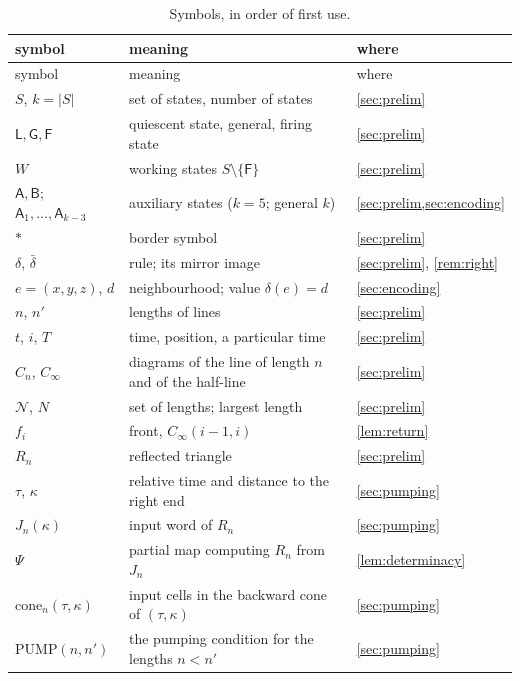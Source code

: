 {\small
\begin{longtable}{@{}p{}>{\raggedright\arraybackslash}p{}>{\raggedright\arraybackslash}p{}@{}}
\caption{Symbols, in order of first use.}\label{tab:symbols}\\
\toprule
symbol & meaning & where\\
\midrule
\endfirsthead
\toprule
symbol & meaning & where\\
\midrule
\endhead
\bottomrule
\endfoot
$S$, $k=|S|$ & set of states, number of states & \cref{sec:prelim}\\
$\mathsf L,\mathsf G,\mathsf F$ & quiescent state, general, firing state & \cref{sec:prelim}\\
$W$ & working states $S\setminus\{\mathsf F\}$ & \cref{sec:prelim}\\
$\mathsf A,\mathsf B$; $\mathsf A_1,\dots,\mathsf A_{k-3}$ & auxiliary states ($k=5$; general $k$) & \cref{sec:prelim,sec:encoding}\\
$\ast$ & border symbol & \cref{sec:prelim}\\
$\delta$, $\bar\delta$ & rule; its mirror image & \cref{sec:prelim}, \cref{rem:right}\\
$e=(x,y,z)$, $d$ & neighbourhood; value $\delta(e)=d$ & \cref{sec:encoding}\\
$n$, $n'$ & lengths of lines & \cref{sec:prelim}\\
$t$, $i$, $T$ & time, position, a particular time & \cref{sec:prelim}\\
$C_n$, $C_\infty$ & diagrams of the line of length $n$ and of the half-line & \cref{sec:prelim}\\
$\mathcal N$, $N$ & set of lengths; largest length & \cref{sec:prelim}\\
$f_i$ & front, $C_\infty(i-1,i)$ & \cref{lem:return}\\
$R_n$ & reflected triangle & \cref{sec:prelim}\\
$\tau$, $\kappa$ & relative time and distance to the right end & \cref{sec:pumping}\\
$J_n(\kappa)$ & input word of $R_n$ & \cref{sec:pumping}\\
$\Psi$ & partial map computing $R_n$ from $J_n$ & \cref{lem:determinacy}\\
$\mathrm{cone}_n(\tau,\kappa)$ & input cells in the backward cone of $(\tau,\kappa)$ & \cref{sec:pumping}\\
$\mathrm{PUMP}(n,n')$ & the pumping condition for the lengths $n<n'$ & \cref{sec:pumping}\\

\end{longtable}}
